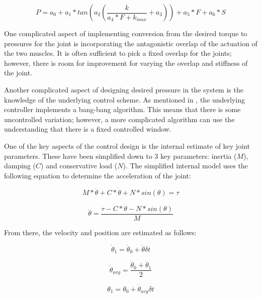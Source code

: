 \begin{equation}
P = a_{0} + a_{1} * tan(a_{2} (\dfrac{k}{a_{4} * F + k_{max}} + a_{3})) + a_{5} * F + a_{6} * S
\end{equation}

One complicated aspect of implementing conversion from the desired torque to 
pressures for
the joint is incorporating the antagonistic overlap of the actuation of the two 
muscles. It is often sufficient to pick a fixed overlap for the joints; however,
there is room for improvement for varying the overlap and stiffness of the joint.

Another complicated aspect of designing desired pressure in the system is the
knowledge of the underlying control scheme. As mentioned in \cite{HuntPMuscles},
the underlying controller implements a bang-bang algorithm. This means that 
there is some uncontrolled variation; however, a more complicated algorithm
can use the understanding that there is a fixed controlled window.


One of the key aspects of the control design is the internal estimate of key 
joint parameters. These have been simplified down to 3 key parameters: inertia 
($M$), damping ($C$) and conservative load ($N$). The simplified internal 
model uses the following equation to determine the acceleration of the joint:

\begin{equation}
M * \ddot{\theta} + C * \dot{\theta} + N * sin(\theta) = \tau
\end{equation}

\begin{equation} \label{eq:accel}
\ddot{\theta} = \dfrac{\tau - C * \dot{\theta} - N * sin(\theta)}{M}
\end{equation}

From there, the velocity and position are estimated as follows:

\begin{equation}
\dot{\theta}_{1} = \dot{\theta}_{0} + \ddot{\theta} \delta t
\end{equation}

\begin{equation}
\dot{\theta}_{avg} = \dfrac{\dot{\theta}_{0} + \dot{\theta}_{1}}{2}
\end{equation}

\begin{equation}
\theta_{1} = \theta_{0} + \dot{\theta}_{avg} \delta t
\end{equation}

